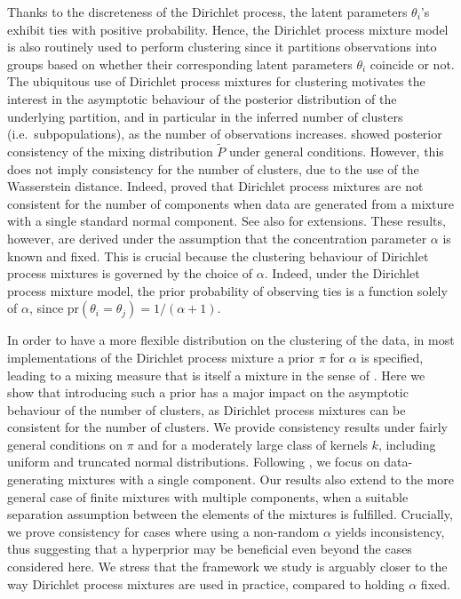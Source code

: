 \documentclass[12pt]{article}
\begin{document}
Thanks to the discreteness of the Dirichlet process, the latent parameters $\theta_i$'s %
exhibit ties with positive probability. Hence, the Dirichlet process mixture model %
is also routinely used to perform clustering since it partitions observations into %
groups based on whether their corresponding latent parameters $\theta_i$ coincide or not. The ubiquitous use of Dirichlet process mixtures for clustering motivates the interest in the %
asymptotic behaviour of the posterior distribution of the underlying partition, and in particular in 
the inferred number of clusters (i.e.\ subpopulations), as the number of observations increases. \cite{Nguyen2013} showed posterior consistency of the mixing distribution $\tilde{P}$ under general conditions. 
However, this does not imply consistency for the number of clusters, due to the use of the Wasserstein distance. Indeed, 
\cite{Miller2013} %
proved that Dirichlet process mixtures are not consistent for the number of components when data are generated from a mixture with a single standard normal component. 
See also \cite{Miller2014} for extensions.
These results, however, are derived under the assumption that the concentration parameter $\alpha$ is known and fixed.
This is crucial because the clustering behaviour of Dirichlet process mixtures is governed by the choice of $\alpha$. 
Indeed, under the Dirichlet process mixture model, %
the prior probability of observing ties is %
	a function solely of $\alpha$, since $\text{pr}( \theta_i = \theta_j ) = 1/(\alpha+1)$.

In order to have a more flexible distribution on the clustering of the data, in %
most implementations of the Dirichlet process mixture  %
a prior $\pi$ for $\alpha$ is specified, leading to a mixing measure that is itself a mixture %
in the sense of \cite{Antoniak1974c}. Here we show that introducing such a prior %
 has a major impact on the asymptotic behaviour of the number of clusters, as Dirichlet process mixtures can be consistent for the number of clusters. 
We provide consistency results under fairly general conditions on $\pi$ and for a moderately large class of kernels $k$, including uniform and truncated normal distributions.
Following \cite{Miller2013}, we focus on data-generating mixtures with a single component. Our results also extend to the more general case of finite mixtures with multiple components, when a suitable separation assumption between the elements of the mixtures is fulfilled. Crucially, we prove consistency for cases where using a non-random $\alpha$ %
yields inconsistency, thus suggesting that %
a hyperprior may be beneficial even beyond the cases considered here.
We stress that the framework we study is arguably closer to the way Dirichlet process mixtures are used in practice, compared to holding $\alpha$ fixed. 
\end{document}
